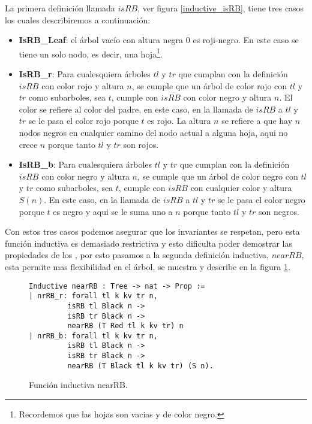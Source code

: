 La primera definici\'on llamada $isRB$, ver figura \ref{inductive_isRB}, tiene tres casos los
cuales describiremos a continuaci\'on:
\begin{itemize}
        \item \textbf{IsRB\_Leaf}: el árbol vacío con altura negra 0 es roji-negro. En este caso
        se tiene un solo nodo, es decir, una hoja\footnote{Recordemos que las hojas son vacias y de
        color negro.}.
        \item \textbf{IsRB\_r}: Para cualesquiera \'arboles $tl$ y $tr$ que cumplan con la
        definici\'on $isRB$ con color rojo y altura $n$, se cumple que un \'arbol de color rojo con
        $tl$ y $tr$ como subarboles, sea $t$, cumple con $isRB$ con color negro y altura $n$. El
        color se refiere al color del padre, en este caso, en la llamada de $isRB$ a $tl$ y $tr$ se
        le pasa el color rojo porque $t$ es rojo. La altura $n$ se refiere a que hay $n$ nodos
        negros en cualquier camino del nodo actual a alguna hoja, aqui no crece $n$ porque tanto
        $tl$ y $tr$ son rojos.
        \item \textbf{IsRB\_b}: Para cualesquiera \'arboles $tl$ y $tr$ que cumplan con la
        definici\'on $isRB$ con color negro y altura $n$, se cumple que un \'arbol de color negro
        con $tl$ y $tr$ como subarboles, sea $t$, cumple con $isRB$ con cualquier color y altura
        $S(n)$. En este caso, en la llamada de $isRB$ a $tl$ y $tr$ se le pasa el color negro
        porque $t$ es negro y aqui se le suma uno a $n$ porque tanto $tl$ y $tr$ son negros.
\end{itemize}

Con estos tres casos podemos asegurar que los invariantes se respetan, pero esta funci\'on
inductiva es demasiado restrictiva y esto dificulta poder demostrar las propiedades de los {\arns},
por esto pasamos a la segunda definici\'on inductiva, $nearRB$, esta permite mas flexibilidad en el
\'arbol, se muestra y describe en la figura \ref{inductive_nearRB}.
\begin{figure}
\centering
\captionsetup{justification=centering}
\begin{verbatim}
Inductive nearRB : Tree -> nat -> Prop :=
| nrRB_r: forall tl k kv tr n,
         isRB tl Black n ->
         isRB tr Black n ->
         nearRB (T Red tl k kv tr) n
| nrRB_b: forall tl k kv tr n,
         isRB tl Black n ->
         isRB tr Black n ->
         nearRB (T Black tl k kv tr) (S n).
\end{verbatim}
\caption{Funci\'on inductiva nearRB.}
\label{inductive_nearRB}
\end{figure}

